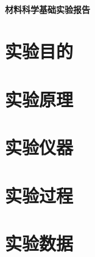 \documentclass[a4paper,utf8]{article}
\begin{document}
\begin{center}
    {\mbox{}\\[7em]\bfseries\songti%
    材料科学基础实验报告}\\[34mm]
\end{center}
\newpage
\section{实验目的}
\section{实验原理}%
\section{实验仪器}%
\section{实验过程}%
\section{实验数据}
\end{document}
